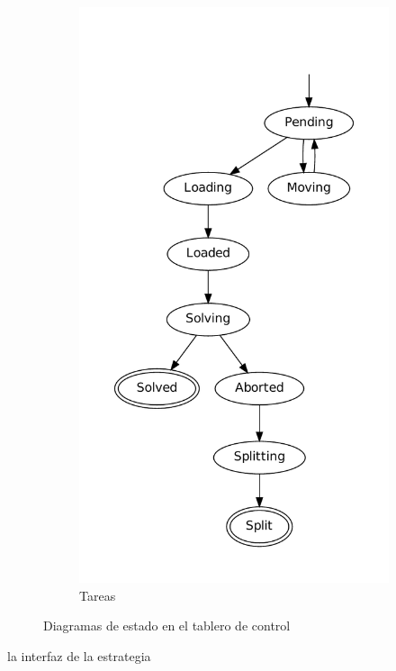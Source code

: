 \begin{figure}
\begin{subfigure}[b]{0.5\textwidth}
		\includegraphics[scale=0.5]{graphs/taskstates}
		\caption{Tareas}
	\end{subfigure}
	\caption{Diagramas de estado en el tablero de control}
\end{figure}

la interfaz de la estrategia



